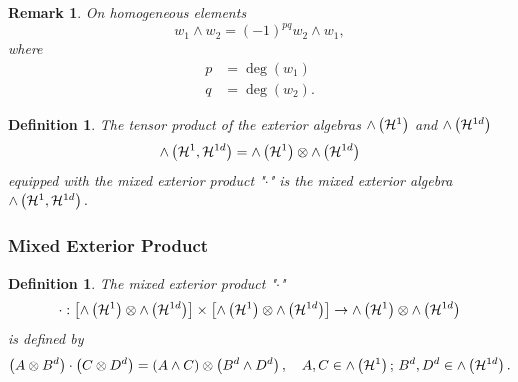 \documentclass[aps,preprint]{revtex4}%
\newtheorem{definition}[theorem]{Definition}
\newtheorem{remark}[theorem]{Remark}
\begin{document}
\begin{remark}
On homogeneous elements
\begin{equation}
w_{1}\wedge w_{2}=\left(  -1\right)  ^{pq}w_{2}\wedge w_{1},
\end{equation}
where
\begin{align}
p  &  =\deg\left(  w_{1}\right) \\
q  &  =\deg\left(  w_{2}\right)  .
\end{align}

\end{remark}

\begin{definition}
The tensor product of the exterior algebras ${\huge \wedge}\left(
\mathcal{H}^{1}\right)  $ and ${\huge \wedge}\left(  \mathcal{H}^{1d}\right)
$
\begin{equation}
{\huge \wedge}\left(  \mathcal{H}^{1},\mathcal{H}^{1d}\right)  ={\huge \wedge
}\left(  \mathcal{H}^{1}\right)  \otimes{\huge \wedge}\left(  \mathcal{H}%
^{1d}\right)
\end{equation}
equipped with the mixed exterior product "$\cdot$" is the \emph{mixed exterior
algebra} ${\huge \wedge}\left(  \mathcal{H}^{1},\mathcal{H}^{1d}\right)  .$
\end{definition}

\subsubsection{Mixed Exterior Product}

\begin{definition}
\bigskip The mixed exterior product "$\cdot$"
\begin{equation}
\cdot:\left[  {\huge \wedge}\left(  \mathcal{H}^{1}\right)  \otimes
{\huge \wedge}\left(  \mathcal{H}^{1d}\right)  \right]  \times\left[
{\huge \wedge}\left(  \mathcal{H}^{1}\right)  \otimes{\huge \wedge}\left(
\mathcal{H}^{1d}\right)  \right]  \rightarrow{\huge \wedge}\left(
\mathcal{H}^{1}\right)  \otimes{\huge \wedge}\left(  \mathcal{H}^{1d}\right)
\end{equation}
is defined by
\begin{equation}
\left(  A\otimes B^{d}\right)  \cdot\left(  C\otimes D^{d}\right)  =\left(
A\wedge C\right)  \otimes\left(  B^{d}\wedge D^{d}\right)  ,\quad
A,C\in{\huge \wedge}\left(  \mathcal{H}^{1}\right)  ;\,B^{d},D^{d}%
\in{\huge \wedge}\left(  \mathcal{H}^{1d}\right)  .
\end{equation}

\end{definition}
\end{document}
